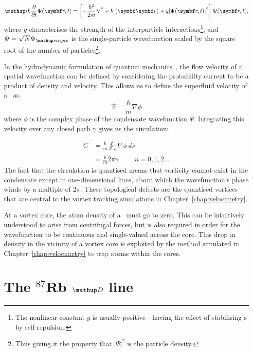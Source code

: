 \begin{align}
\ii\hbar\pdv{t} \Psi(\vec r, t) = \left[-\frac{\hbar^2}{2m}\nabla^2 + V(\vec{\vec r}) + g|\Psi(\vec r, t)|^2\right]\Psi(\vec r, t),
\end{align}
where $g$ characterises the strength of the interparticle interactions\footnote{The nonlinear constant $g$ is usually positive---having the effect of stabilising \bec s by self-repulsion.}, and $\Psi = \sqrt{N}\Psi_\up{single}$ is the single-particle wavefunction scaled by the square root of the number of particles\footnote{Thus giving it the property that $|\Psi|^2$ is the particle density.}.

In the hydrodynamic formulation of quantum mechanics~\cite{madelung_quantentheorie_1927}, the flow velocity of a spatial wavefunction can be defined by considering the probability current to be a product of density and velocity. This allows us to define the superfluid velocity of a \bec\ as:
\begin{equation}
\vec v = \frac\hbar m \nabla\phi
\end{equation}
where $\phi$ is the complex phase of the condensate wavefunction $\Psi$. Integrating this velocity over any closed path $\gamma$ gives us the circulation:

\begin{align}
C &= \frac\hbar m\oint_\gamma\nabla\phi\,ds\\
  &= \frac\hbar m 2\pi n.\qquad n=0,1,2\dots
\end{align}
The fact that the circulation is quantised means that vorticity cannot exist in the condensate except in one-dimensional lines, about which the wavefunction's phase winds by a multiple of $2\pi$. These topological defects are the quantised vortices that are central to the vortex tracking simulations in Chapter~\ref{chap:velocimetry}.

At a vortex core, the atom density of a \bec\ must go to zero. This can be intuitively understood to arise from centrifugal forces, but is also required in order for the wavefunction to be continuous and single-valued across the core. This drop in density in the vicinity of a vortex core is exploited by the method simulated in Chapter~\ref{chap:velocimetry} to trap atoms within the cores.

\section{The $^{87}$Rb $\up{D}$ line}\label{sec:the_rubidium_D_line}

